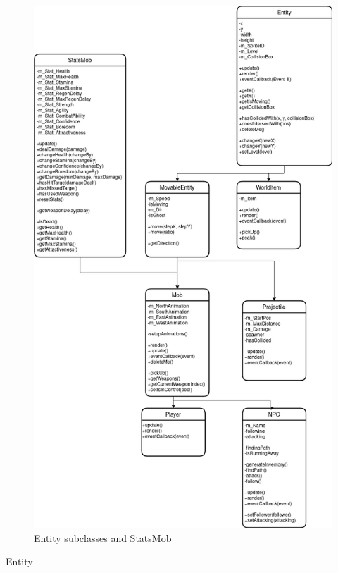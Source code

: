 \documentclass[../../Main.tex]{subfiles}
\begin{document}
    \begin{figure}[hbt!]
        \centerline{\includegraphics[scale=0.5]{img/Classes/Entities.png}}
        \caption{Entity subclasses and StatsMob}
        \label{fig}
    \end{figure}
    Entity
\end{document}
